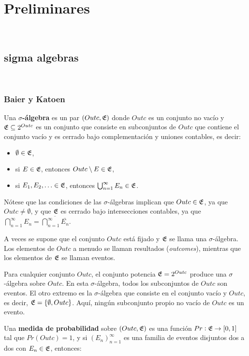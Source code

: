 \chapter{Preliminares}
~\label{cap:pre}

\section{sigma algebras}
~\label{cap:pre:sec:algebra}

\subsection{Baier y Katoen}

Una \textbf{\(\sigma\)-álgebra} es un par \((Outc, \mathfrak{E})\) donde \(Outc\) es
un conjunto no vacío y \(\mathfrak{E} \subseteq 2^{Outc}\) es un conjunto que
consiste en subconjuntos de \(Outc\) que contiene el conjunto vacío y es
cerrado bajo complementación y uniones contables, es decir:

\begin{itemize}
	\item \(\emptyset \in \mathfrak{E}\),
	\item si \(E \in \mathfrak{E}\), entonces \(Outc \setminus E \in \mathfrak{E}\),
	\item si \(E_1, E_2, \ldots \in \mathfrak{E}\), entonces \(\bigcup_{n=1}^{\infty} E_n \in
	      \mathfrak{E}\).
\end{itemize}

Nótese que las condiciones de las \(\sigma\)-álgebras implican que \(Outc \in
\mathfrak{E}\), ya que \(Outc \neq \emptyset\), y que \(\mathfrak{E}\) es cerrado bajo
intersecciones contables, ya que \(\bigcap_{n=1}^{\infty} E_n =
\overline{\bigcap_{n=1}^{\infty} \overline{E_n}}\).

A veces se supone que el conjunto \(Outc\) está fijado y \(\mathfrak{E}\) se llama
una \(\sigma\)-álgebra. Los elementos de \(Outc\) a menudo se llaman resultados
(\textit{outcomes}), mientras que los elementos de \(\mathfrak{E}\) se llaman
eventos.

Para cualquier conjunto \(Outc\), el conjunto potencia \(\mathfrak{E} = 2^{Outc}\)
produce una \(\sigma\)-álgebra sobre \(Outc\). En esta \(\sigma\)-álgebra,
todos los subconjuntos de \(Outc\) son eventos. El otro extremo es la
\(\sigma\)-álgebra que consiste en el conjunto vacío y \(Outc\), es decir,
\(\mathfrak{E} = \{ \emptyset, Outc \}\). Aquí, ningún subconjunto propio no vacío
de \(Outc\) es un evento.

Una\textbf{ medida de probabilidad} sobre \((Outc, \mathfrak{E})\) es una función
\(Pr : \mathfrak{E} \to [0, 1]\) tal que \(Pr(Outc) = 1\), y si
\((E_n)_{n=1}^{\infty}\) es una familia de eventos disjuntos dos a dos con
\(E_n \in \mathfrak{E}\), entonces:

